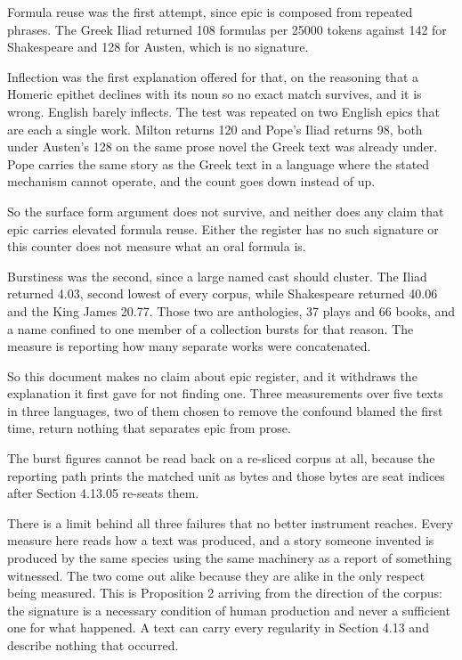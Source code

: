Formula reuse was the first attempt, since epic is composed from repeated phrases. The Greek Iliad returned 108 formulas per 25000 tokens against 142 for Shakespeare and 128 for Austen, which is no signature.

Inflection was the first explanation offered for that, on the reasoning that a Homeric epithet declines with its noun so no exact match survives, and it is wrong. English barely inflects. The test was repeated on two English epics that are each a single work. Milton returns 120 and Pope's Iliad returns 98, both under Austen's 128 on the same prose novel the Greek text was already under. Pope carries the same story as the Greek text in a language where the stated mechanism cannot operate, and the count goes down instead of up.

So the surface form argument does not survive, and neither does any claim that epic carries elevated formula reuse. Either the register has no such signature or this counter does not measure what an oral formula is.

Burstiness was the second, since a large named cast should cluster. The Iliad returned 4.03, second lowest of every corpus, while Shakespeare returned 40.06 and the King James 20.77. Those two are anthologies, 37 plays and 66 books, and a name confined to one member of a collection bursts for that reason. The measure is reporting how many separate works were concatenated.

So this document makes no claim about epic register, and it withdraws the explanation it first gave for not finding one. Three measurements over five texts in three languages, two of them chosen to remove the confound blamed the first time, return nothing that separates epic from prose.

The burst figures cannot be read back on a re-sliced corpus at all, because the reporting path prints the matched unit as bytes and those bytes are seat indices after Section 4.13.05 re-seats them.

There is a limit behind all three failures that no better instrument reaches. Every measure here reads how a text was produced, and a story someone invented is produced by the same species using the same machinery as a report of something witnessed. The two come out alike because they are alike in the only respect being measured. This is Proposition 2 arriving from the direction of the corpus: the signature is a necessary condition of human production and never a sufficient one for what happened. A text can carry every regularity in Section 4.13 and describe nothing that occurred.

